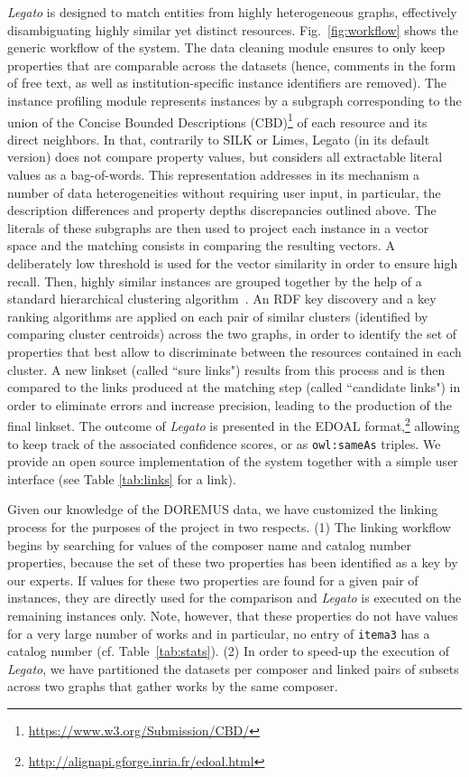 {\it Legato} is designed to match entities from highly heterogeneous graphs, effectively disambiguating highly similar yet distinct resources. Fig.~\ref{fig:workflow} shows the generic workflow of the system. The data cleaning module ensures to only keep properties that are comparable across the datasets (hence, comments in the form of free text, as well as institution-specific instance identifiers are removed). The instance profiling module represents instances by a subgraph corresponding to the union of the Concise Bounded Descriptions (CBD)\footnote{\url{https://www.w3.org/Submission/CBD/}} of each resource and its direct neighbors.  In that, contrarily to SILK or Limes, Legato (in its default version) does not compare property values, but considers all extractable literal values as a bag-of-words.  This representation addresses in its mechanism a number of data heterogeneities without requiring user input, in particular, the description differences and property depths discrepancies outlined above. The literals of these subgraphs are then used to project each instance in a vector space and the matching consists in comparing the resulting vectors. A deliberately low threshold is used for the vector similarity in order to ensure  high recall. Then, highly similar instances are grouped together by the help of a standard hierarchical clustering algorithm~\cite{RokachM05a}. An RDF key discovery \cite{SAKey} and a key ranking \cite{achichiEST16} algorithms are applied on each pair of similar clusters (identified by comparing cluster centroids) across the two graphs, in order to identify the set of properties that best allow to discriminate between the resources contained in each cluster. A new linkset (called ``sure links") results from this process and is then compared to the links produced at the matching step (called ``candidate links") in order to eliminate errors and increase precision, leading to the production of the final linkset. The outcome of {\it Legato} is presented in the EDOAL format,\footnote{\url{http://alignapi.gforge.inria.fr/edoal.html}}  allowing to keep track of the associated confidence scores, or as {\tt owl:sameAs} triples. We provide an open source implementation of the system together with a simple user interface (see Table \ref{tab:links} for a link).

Given our knowledge of the DOREMUS data, we have customized the linking process for the purposes of the project in two respects. (1) The linking workflow begins by searching for values of the composer name and catalog number properties, because the set of these two properties has been identified as a key by our experts. If values for these two properties are found for a given pair of instances, they are directly used for the comparison and {\it Legato} is executed on the remaining instances only. Note, however, that these properties do not have values for a very large number of works and in particular, no entry of {\tt itema3} has a catalog number (cf. Table~\ref{tab:stats}). (2) In order to speed-up the execution of {\it Legato}, we have partitioned the datasets per composer and linked pairs of subsets across two graphs that gather works by the same composer.

